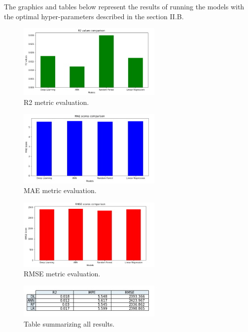 \documentclass[journal]{IEEEtran} %
\begin{document}
The graphics and tables below represent the results of running the models with the optimal hyper-parameters described in the section II.B.\\


\begin{figure}[htp]
    \centering
    \includegraphics[width=7cm]{Project2-Report_FAA/figures/R2.png}
    \caption{R2 metric evaluation.}
    \label{fig:importance}
\end{figure}

\begin{figure}[htp]
    \centering
    \includegraphics[width=7cm]{Project2-Report_FAA/figures/MAE.png}
    \caption{MAE metric evaluation.}
    \label{fig:importance}
\end{figure}

\begin{figure}[htp]
    \centering
    \includegraphics[width=7cm]{Project2-Report_FAA/figures/RMSE_res.png}
    \caption{RMSE metric evaluation.}
    \label{fig:importance}
\end{figure}

\begin{figure}[htp]
    \centering
    \includegraphics[width=7cm]{Project2-Report_FAA/figures/final_table.png}
    \caption{Table summarizing all results.}
    \label{fig:importance}
\end{figure}
\end{document}
